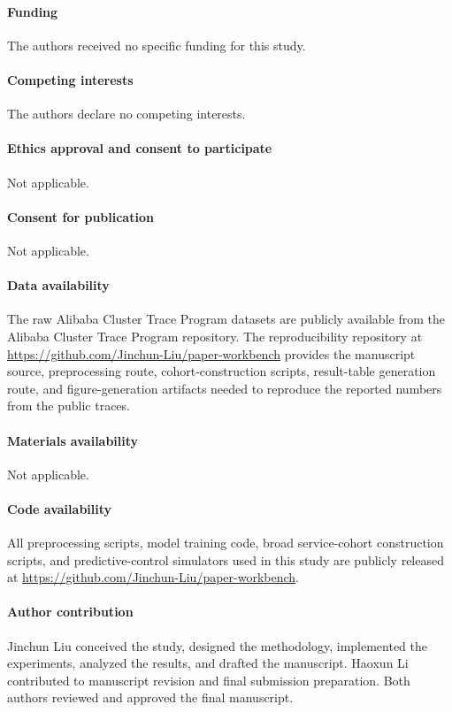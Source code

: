 \paragraph{Funding}
The authors received no specific funding for this study.

\paragraph{Competing interests}
The authors declare no competing interests.

\paragraph{Ethics approval and consent to participate}
Not applicable.

\paragraph{Consent for publication}
Not applicable.

\paragraph{Data availability}
The raw Alibaba Cluster Trace Program datasets are publicly available from the Alibaba Cluster Trace Program repository. The reproducibility repository at \url{https://github.com/Jinchun-Liu/paper-workbench} provides the manuscript source, preprocessing route, cohort-construction scripts, result-table generation route, and figure-generation artifacts needed to reproduce the reported numbers from the public traces.

\paragraph{Materials availability}
Not applicable.

\paragraph{Code availability}
All preprocessing scripts, model training code, broad service-cohort construction scripts, and predictive-control simulators used in this study are publicly released at \url{https://github.com/Jinchun-Liu/paper-workbench}.

\paragraph{Author contribution}
Jinchun Liu conceived the study, designed the methodology, implemented the experiments, analyzed the results, and drafted the manuscript. Haoxun Li contributed to manuscript revision and final submission preparation. Both authors reviewed and approved the final manuscript.
